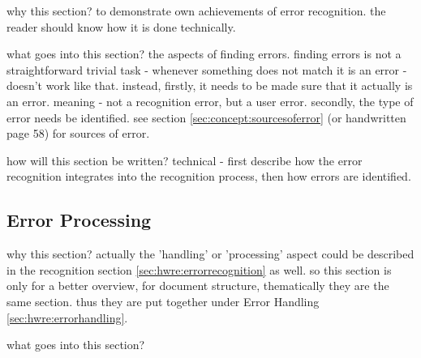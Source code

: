 why this section? to demonstrate own achievements of error recognition.
the reader should know how it is done technically.

what goes into this section? the aspects of finding errors. finding errors
is not a straightforward trivial task - whenever something does not match
it is an error - doesn't work like that. instead, 
firstly, it needs to be made sure that it actually is an error.
meaning - not a recognition error, but a user error.
secondly, the type of error needs be identified.
see section \ref{sec:concept:sourcesoferror} (or handwritten page 58)
for sources of error.

how will this section be written?
technical - first describe how the error recognition integrates into the
recognition process, then how errors are identified.


\subsection{Error Processing}
\label{sec:hwre:errorprocessing}


why this section? 
actually the 'handling' or 'processing' aspect could be 
described in the recognition section \ref{sec:hwre:errorrecognition} as well.
so this section is only for a better overview, for document structure, 
thematically they are the same section. thus they are put together under
Error Handling \ref{sec:hwre:errorhandling}.

what goes into this section?

